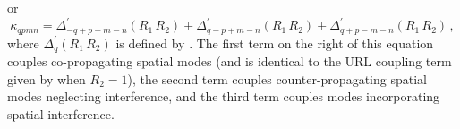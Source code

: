 or
\begin{equation}
  \label{eqn:mml_1d_kqpmn_swl}
  \kappa_{q p m n} = \Delta^\prime_{-q + p + m - n}\left(R_1\, R_2\right) + \Delta^\prime_{q - p + m - n}\left(R_1\, R_2\right) + \Delta^\prime_{q + p - m - n}\left(R_1\, R_2\right)\, ,
\end{equation}
where $\Delta^\prime_{q}\left(R_1\, R_2\right)$ is defined by . The first term on the right of this equation couples co-propagating spatial modes (and is identical to the URL coupling term given by  when $R_2 = 1$), the second term couples counter-propagating spatial modes neglecting interference, and the third term couples modes incorporating spatial interference.


